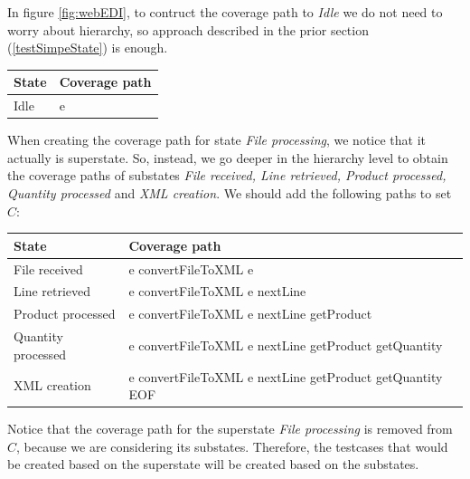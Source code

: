 In figure \ref{fig:webEDI}, to contruct the coverage path to \textit{Idle} we do not need to worry about hierarchy, so approach described in the prior section (\ref{testSimpeState}) is enough.

\begin{center}
\begin{tabular}{| l | l|}

\hline

State & Coverage path \\ \hline

Idle & e \\

\hline
\end{tabular}
\end{center}

When creating the coverage path for state \textit{File processing}, we notice that it actually is superstate. So, instead, we go deeper in the hierarchy level to obtain the coverage paths of substates \textit{File received, Line retrieved, Product processed, Quantity processed} and \textit{XML creation}. We should add the following paths to set $C$:

\begin{center}
\begin{tabular}{| l | l|}

\hline

State & Coverage path \\ \hline

File received & e convertFileToXML e \\ \hline

Line retrieved & e convertFileToXML e nextLine\\ \hline

Product processed & e convertFileToXML e nextLine getProduct\\ \hline

Quantity processed & e convertFileToXML e nextLine getProduct getQuantity\\ \hline

XML creation & e convertFileToXML e nextLine getProduct getQuantity EOF\\ 

\hline
\end{tabular}
\end{center}

Notice that the coverage path for the superstate \textit{File processing} is removed from $C$, because we are considering its substates. Therefore, the testcases that would be created based on the superstate will be created based on the substates.

